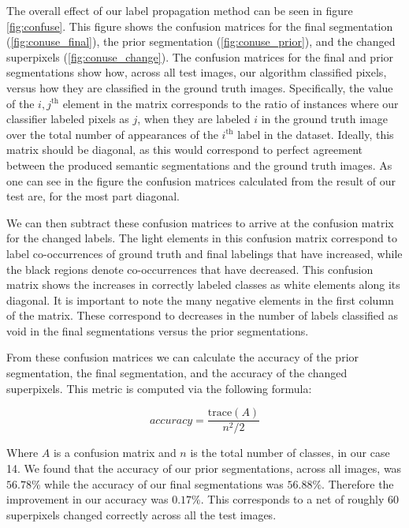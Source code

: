 \documentclass{article} %
\begin{document}
The overall effect of our label propagation method can be seen in figure \ref{fig:confuse}. This figure shows the confusion matrices for the final segmentation (\ref{fig:conuse_final}), the prior segmentation (\ref{fig:conuse_prior}), and the changed superpixels (\ref{fig:conuse_change}). The confusion matrices for the final and prior segmentations show how, across all test images, our algorithm classified pixels, versus how they are classified in the ground truth images. Specifically, the value  of the $i,j^\textrm{th}$ element in the matrix corresponds to the ratio of instances where our classifier labeled pixels as $j$, when they are labeled $i$ in the ground truth image over the total number of appearances of the $i^\textrm{th}$ label in the dataset. Ideally, this matrix should be diagonal, as this would correspond to perfect agreement between the produced semantic segmentations and the ground truth images. As one can see in the figure the confusion matrices calculated from the result of our test are, for the most part diagonal. 

We can then subtract these confusion matrices to arrive at the confusion matrix for the changed labels. The light elements in this confusion matrix correspond to label co-occurrences of ground truth and final labelings that have increased, while the black regions denote co-occurrences that have decreased. This confusion matrix shows the increases in correctly labeled classes as white elements along its diagonal. It is important to note the many negative elements in the first column of the matrix. These correspond to decreases in the number of labels classified as void in the final segmentations versus the prior segmentations.

From these confusion matrices we can calculate the accuracy of the prior segmentation, the final segmentation, and the accuracy of the changed superpixels. This metric is computed via the following formula:

\begin{equation}
	accuracy = \frac{\mathrm{trace}(A)}{n^2/2}
\end{equation}

Where $A$ is a confusion matrix and $n$ is the total number of classes, in our case 14. We found that the accuracy of our prior segmentations, across all images, was $56.78\%$ while the accuracy of our final segmentations was $56.88\%$. Therefore the improvement in our accuracy was $0.17\%$. This corresponds to a net of roughly 60 superpixels changed correctly across all the test images.
\end{document}
